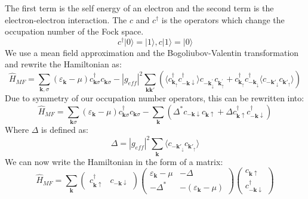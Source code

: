         The first term is the self energy of an electron and the second term is the electron-electron interaction. The $c$ and $c^{\dagger}$ is the operators which change the occupation number of the Fock space.
        \begin{equation}
            c^{\dagger}|0\rangle = |1\rangle, c |1\rangle = |0 \rangle
        \end{equation}
        We use a mean field approximation and the Bogoliubov-Valentin transformation and rewrite the Hamiltonian as: 
        \begin{equation}
        \hat{H}_{MF}= \sum_{\mathbf{k} ,\sigma} (\varepsilon_{\mathbf{k}}-\mu) c_{\mathbf{k} \sigma}^{\dagger} c_{\mathbf{k} \sigma}-\left|g_{eff} \right|^2 \sum_{\mathbf{k} \mathbf{k'}} \left(\langle c_{\mathbf{k_{\uparrow}}}^{\dagger} c_{-\mathbf{k} \downarrow}^{\dagger}\rangle c_{-\mathbf{k}^{\prime}_{\downarrow} }c_{\mathbf{k}^{\prime}_{\uparrow}} + c_{\mathbf{k}_{\uparrow}}^{\dagger} c_{-\mathbf{k}_{\downarrow}}^{\dagger} \langle c_{-\mathbf{k'}_{\downarrow}} c_{\mathbf{k'_{\uparrow}}} \rangle \right)
        \end{equation}
        Due to symmetry of our occupation number operators, this  can be rewritten into: 
        \begin{equation}
            \hat{H}_{MF}=\sum_{\mathbf{k} \sigma}\left(\varepsilon_{\mathbf{k}}-\mu\right) c_{\mathbf{k} \sigma}^{\dagger} c_{\mathbf{k} \sigma}-\sum_{\mathbf{k}}\left(\Delta^* c_{-\mathbf{k} \downarrow} c_{\mathbf{k} \uparrow}+\Delta c_{\mathbf{k} \uparrow}^{\dagger} c_{-\mathbf{k} \downarrow}^{\dagger}\right)
        \end{equation}
        Where $\Delta$ is defined as: 
        \begin{equation}
            \Delta = \left|g_{eff} \right|^2 \sum_{\mathbf{k}} \langle c_{-\mathbf{k'}_{\downarrow}} c_{\mathbf{k'_{\uparrow}}} \rangle
        \end{equation}
        We can now write the Hamiltonian in the form of a matrix: 
        \begin{equation}
            \hat{H}_{MF}=\sum_{\mathbf{k}}\left(\begin{array}{ll}
            c_{\mathbf{k} \uparrow}^{\dagger} & c_{-\mathbf{k} \downarrow}
            \end{array}\right)\left(\begin{array}{cc}
            \varepsilon_{\mathbf{k}}-\mu & -\Delta \\
            -\Delta^* & -\left(\varepsilon_{\mathbf{k}}-\mu\right)
            \end{array}\right)\left(\begin{array}{c}
            c_{\mathbf{k} \uparrow} \\
            c_{-\mathbf{k} \downarrow}^{\dagger}
            \end{array}\right)
        \end{equation}
